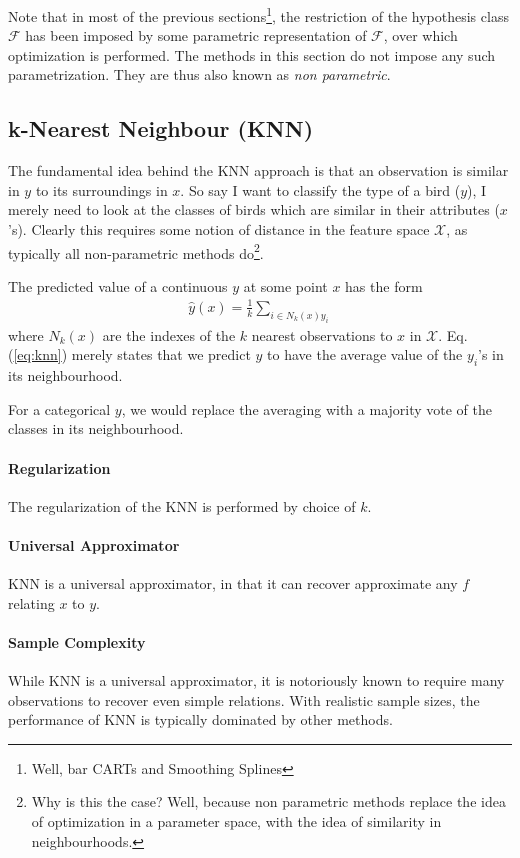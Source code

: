 \documentclass[12pt,a4paper]{article}
\theoremstyle{plain}
\theoremstyle{definition}
\newcommand{\hyp}{f}
\newcommand{\hypclass}{\mathcal{F}}
\newcommand{\featureS}{\mathcal{X}}
\begin{document}
Note that in most of the previous sections\footnote{Well, bar CARTs and Smoothing Splines}, the restriction of the hypothesis class $\hypclass$ has been imposed by some parametric representation of $\hypclass$, over which optimization is performed.
The methods in this section do not impose any such parametrization. They are thus also known as \emph{non parametric}.



\subsection{k-Nearest Neighbour (KNN)}
\label{sec:knn}
The fundamental idea behind the KNN approach is that an observation is similar in $y$ to its surroundings in $x$. 
So say I want to classify the type of a bird ($y$), I merely need to look at the classes of birds which are similar in their attributes ($x$'s). 
Clearly this requires some notion of distance in the feature space $\featureS$, as typically all non-parametric methods do\footnote{Why is this the case? Well, because non parametric methods replace the idea of optimization in a parameter space, with the idea of similarity in neighbourhoods.}.

The predicted value of a continuous $y$ at some point $x$ has the form
\begin{align}
\label{eq:knn}
	\hat{y}(x)=\frac{1}{k}\sum_{i \in N_k(x) y_i}
\end{align}
where $N_k(x)$ are the indexes of the $k$ nearest observations to $x$ in $\featureS$.
Eq.(\ref{eq:knn}) merely states that we predict $y$ to have the average value of the $y_i$'s in its neighbourhood.

For a categorical $y$, we would replace the averaging with a majority vote of the classes in its neighbourhood.

\paragraph{Regularization}
The regularization of the KNN is performed by choice of $k$.

\paragraph{Universal Approximator}
KNN is a universal approximator, in that it can recover approximate any $\hyp$ relating $x$ to $y$.

\paragraph{Sample Complexity}
While KNN is a universal approximator, it is notoriously known to require many observations to recover even simple relations. With realistic sample sizes, the performance of KNN is typically dominated by other methods.
\end{document}
